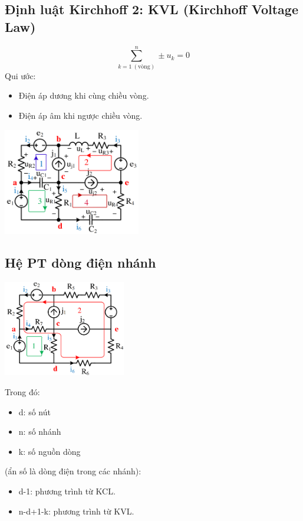 \subsection{Định luật Kirchhoff 2: KVL (Kirchhoff Voltage Law)} 
\begin{equation}
  \sum_{k=1 \ (\text{vòng})}^{n} \pm u_k = 0
\end{equation}
Qui ước:
\begin{itemize}
  \item Điện áp dương khi cùng chiều vòng.
  \item Điện áp âm khi ngược chiều vòng.
\end{itemize}
\begin{center}
  \includegraphics[width = 0.45\textwidth]{./image/17.png}
\end{center}
\subsection{Hệ PT dòng điện nhánh}
\begin{center}
  \includegraphics[width = 0.4\textwidth]{./image/18.png} 
\end{center}
Trong đó:\begin{itemize}
  \item d: số nút
  \item n: số nhánh
  \item k: số nguồn dòng
\end{itemize}
(ẩn số là dòng điện trong các nhánh):
\begin{itemize}
  \item d-1: phương trình từ KCL.
  \item n-d+1-k: phương trình từ KVL.
\end{itemize}
